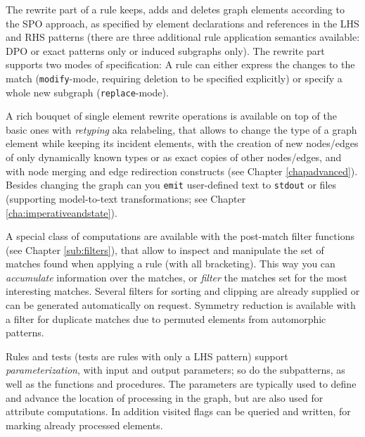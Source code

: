 The rewrite part of a rule keeps, adds and deletes graph elements according to the SPO approach, as specified by element declarations and references in the LHS and RHS patterns (there are three additional rule application semantics available: DPO or exact patterns only or induced subgraphs only).
The rewrite part supports two modes of specification: A rule can either express the changes to the match (\texttt{modify}-mode, requiring deletion to be specified explicitly) or specify a whole new subgraph (\texttt{replace}-mode).

A rich bouquet of single element rewrite operations is available on top of the basic ones with \emph{retyping} aka relabeling, that allows to change the type of a graph element while keeping its incident elements, with the creation of new nodes/edges of only dynamically known types or as exact copies of other nodes/edges, and with node merging and edge redirection constructs (see Chapter \ref{chapadvanced}).
Besides changing the graph can you \texttt{emit} user-defined text to \texttt{stdout} or files (supporting model-to-text transformations; see Chapter \ref{cha:imperativeandstate}).

A special class of computations are available with the post-match filter functions (see Chapter \ref{sub:filters}), that allow to inspect and manipulate the set of matches found when applying a rule (with all bracketing). 
This way you can \emph{accumulate} information over the matches, or \emph{filter} the matches set for the most interesting matches.
Several filters for sorting and clipping are already supplied or can be generated automatically on request.
Symmetry reduction is available with a filter for duplicate matches due to permuted elements from automorphic patterns.

Rules and tests (tests are rules with only a LHS pattern) support \emph{parameterization}, with input and output parameters; so do the subpatterns, as well as the functions and procedures.
The parameters are typically used to define and advance the location of processing in the graph, but are also used for attribute computations.
In addition visited flags can be queried and written, for marking already processed elements.

